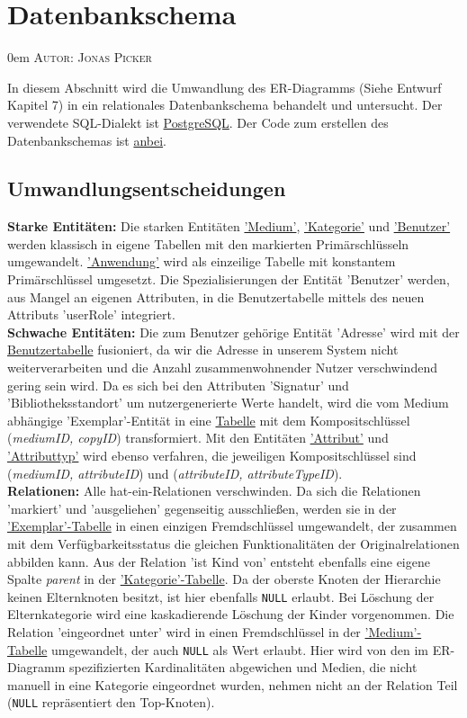 \documentclass{article}
\makeatletter
\newcommand{\sectionauthor}[1]{
	{\parindent 0em \large \scshape Autor: #1 \par \nobreak \vspace*{1em}}
	\@afterheading
}
\makeatother
\begin{document}

\section{Datenbankschema}
\sectionauthor{Jonas Picker}
In diesem Abschnitt wird die Umwandlung des ER-Diagramms (Siehe Entwurf Kapitel 7) in ein relationales Datenbankschema behandelt und untersucht. Der verwendete SQL-Dialekt ist \hyperlink{https://www.postgresql.org/}{PostgreSQL}. Der Code zum erstellen des Datenbankschemas ist \hyperlink{SQLCode}{anbei}.
\subsection{Umwandlungsentscheidungen}
\textbf{Starke Entitäten:} Die starken Entitäten \hyperlink{Medium}{'Medium'}, \hyperlink{Category}{'Kategorie'} und \hyperlink{User}{'Benutzer'} werden klassisch in eigene Tabellen mit den markierten Primärschlüsseln umgewandelt. \hyperlink{Application}{'Anwendung'} wird als einzeilige Tabelle mit konstantem Primärschlüssel umgesetzt. Die Spezialisierungen der Entität 'Benutzer' werden, aus Mangel an eigenen Attributen, in die Benutzertabelle mittels des neuen Attributs 'userRole' integriert. \\
\textbf{Schwache Entitäten:} Die zum Benutzer gehörige Entität 'Adresse' wird mit der \hyperlink{User}{Benutzertabelle} fusioniert, da wir die Adresse in unserem System nicht weiterverarbeiten und die Anzahl zusammenwohnender Nutzer verschwindend gering sein wird. Da es sich bei den Attributen 'Signatur' und 'Bibliotheksstandort' um nutzergenerierte Werte handelt, wird die vom Medium abhängige 'Exemplar'-Entität in eine \hyperlink{Copy}{Tabelle} mit dem Kompositschlüssel (\textit{mediumID, copyID}) transformiert. Mit den Entitäten \hyperlink{CustomAttribute}{'Attribut'} und \hyperlink{AttributeType}{'Attributtyp'} wird ebenso verfahren, die jeweiligen Kompositschlüssel sind (\textit{mediumID, attributeID}) und (\textit{attributeID, attributeTypeID}). \\
\textbf{Relationen:} Alle hat-ein-Relationen verschwinden. Da sich die Relationen 'markiert' und 'ausgeliehen' gegenseitig ausschließen, werden sie in der \hyperlink{Copy}{'Exemplar'-Tabelle} in einen einzigen Fremdschlüssel umgewandelt, der zusammen mit dem Verfügbarkeitsstatus die gleichen Funktionalitäten der Originalrelationen abbilden kann. Aus der Relation 'ist Kind von' entsteht ebenfalls eine eigene Spalte \textit{parent} in der \hyperlink{Category}{'Kategorie'-Tabelle}. Da der oberste Knoten der Hierarchie keinen Elternknoten besitzt, ist hier ebenfalls \texttt{NULL} erlaubt. Bei Löschung der Elternkategorie wird eine kaskadierende Löschung der Kinder vorgenommen. Die Relation 'eingeordnet unter' wird in einen Fremdschlüssel in der \hyperlink{Medium}{'Medium'-Tabelle} umgewandelt, der auch \texttt{NULL} als Wert erlaubt. Hier wird von den im ER-Diagramm spezifizierten Kardinalitäten abgewichen und Medien, die nicht manuell in eine Kategorie eingeordnet wurden, nehmen nicht an der Relation Teil (\texttt{NULL} repräsentiert den Top-Knoten). \\
\end{document}
